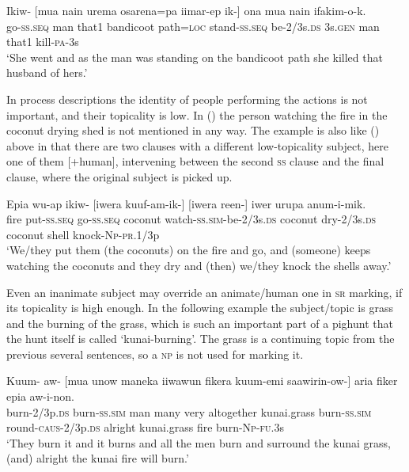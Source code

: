 \ea%
\label{ex:x1478}
\gll Ikiw-  [mua  nain  urema  osarena=pa  iimar-ep ik-] ona  mua  nain  ifakim-o-k. \\
go-\textsc{ss}.\textsc{seq} man  that1 bandicoot path=\textsc{loc} stand-\textsc{ss}.\textsc{seq} be-2/3s.\textsc{ds} 3s.\textsc{gen} man  that1 kill-\textsc{pa}-3s\\
\glt`She went and as the man was standing on the bandicoot path she killed that husband of hers.'
\z

  
In process descriptions the identity of people performing the actions is not important, and their topicality is low. In () the person watching the fire in the coconut drying shed is not mentioned in any way. The example is also like () above in that there are two clauses with a different low-topicality subject, here one of them [+human], intervening between the second \textsc{ss} clause and the final clause, where the original subject is picked up.

\ea%
\label{ex:x1481}
\gll Epia  wu-ap  ikiw- [iwera  kuuf-am-ik-] [iwera  reen-] iwer  urupa  anum-i-mik.  \\
fire  put-\textsc{ss}.\textsc{seq} go-\textsc{ss}.\textsc{seq} coconut  watch-\textsc{ss}.\textsc{sim}-be-2/3s.\textsc{ds} coconut  dry-2/3s.\textsc{ds} coconut shell knock-\textsc{Np}-\textsc{pr}.1/3p     \\
\glt`We/they put them (the coconuts) on the fire and go, and (someone) keeps watching the coconuts and they dry and (then) we/they knock the shells away.'
\z


Even an inanimate subject may override an animate/human one in \textsc{sr} marking, if its topicality is high enough. In the following example the subject/topic is  grass and the burning of the grass, which is such an important part of a pighunt that the hunt itself is called  `kunai-burning'.  The grass is a continuing topic from the previous several sentences, so a \textsc{np} is not used for marking it. 

\ea%
\label{ex:x1479}
\gll Kuum-  aw-  [mua  unow  maneka  iiwawun  fikera kuum-emi  saawirin-ow-]  aria  fiker  epia aw-i-non.\\
burn-2/3p.\textsc{ds}  burn-\textsc{ss}.\textsc{sim} man many very altogether kunai.grass burn-\textsc{ss}.\textsc{sim} round-\textsc{caus}-2/3p.\textsc{ds} alright  kunai.grass  fire burn-\textsc{Np}-\textsc{fu}.3s\\
\glt`They burn it and it burns and all the men burn and surround the kunai grass, (and) alright the kunai fire will burn.'
\z


